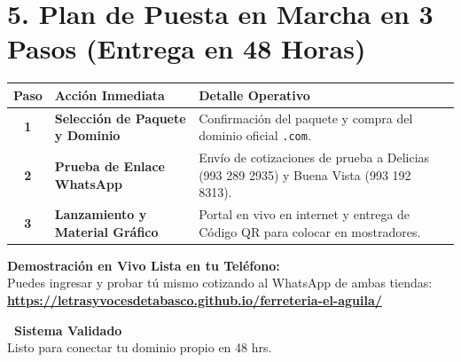 \documentclass[10pt,letterpaper]{article}
\begin{document}
\section*{5. Plan de Puesta en Marcha en 3 Pasos (Entrega en 48 Horas)}

\noindent\begin{tabularx}{\textwidth}{@{}c l X@{}}
    \toprule
    \textbf{Paso} & \textbf{Acción Inmediata} & \textbf{Detalle Operativo} \\
    \midrule
    \textbf{1} & \textbf{Selección de Paquete y Dominio} & Confirmación del paquete y compra del dominio oficial \texttt{.com}. \\
    \addlinespace[3pt]
    \textbf{2} & \textbf{Prueba de Enlace WhatsApp} & Envío de cotizaciones de prueba a Delicias (993 289 2935) y Buena Vista (993 192 8313). \\
    \addlinespace[3pt]
    \textbf{3} & \textbf{Lanzamiento y Material Gráfico} & Portal en vivo en internet y entrega de Código QR para colocar en mostradores. \\
    \bottomrule
\end{tabularx}

\vspace{0.2cm}

\begin{tcolorbox}[colback=SoftGray, colframe=NavyBlue, boxrule=1.5pt]
    \begin{minipage}[c]{0.70\textwidth}
        \textbf{\large Demostración en Vivo Lista en tu Teléfono:}\\
        {\footnotesize Puedes ingresar y probar tú mismo cotizando al WhatsApp de ambas tiendas:}\\
        \textbf{\url{https://letrasyvocesdetabasco.github.io/ferreteria-el-aguila/}}
    \end{minipage}
    \hfill
    \begin{minipage}[c]{0.26\textwidth}
        \centering
        \textbf{\color{DarkGreen}\faBolt\ Sistema Validado}\\
        {\footnotesize Listo para conectar tu dominio propio en 48 hrs.}
    \end{minipage}
\end{tcolorbox}

\vspace{0.25cm}
\end{document}
